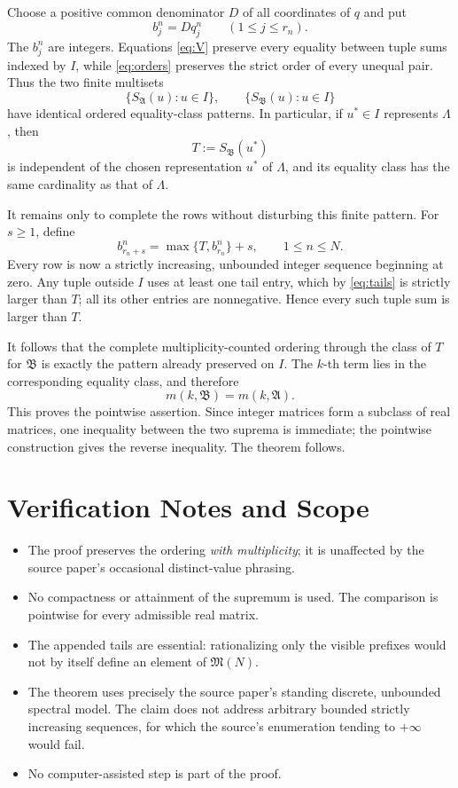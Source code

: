 \documentclass[11pt]{article}
\newcommand{\Acal}{\mathfrak A}
\newcommand{\Mcal}{\mathfrak M}
\begin{document}
Choose a positive common denominator $D$ of all coordinates of $q$ and put
\[
                           b_j^n=Dq_j^n
                           \qquad(1\leq j\leq r_n).
\]
The $b_j^n$ are integers.  Equations \eqref{eq:V} preserve every equality
between tuple sums indexed by $I$, while \eqref{eq:orders} preserves the
strict order of every unequal pair.  Thus the two finite multisets
\[
                  \{S_{\Acal}(u):u\in I\},
                  \qquad
                  \{S_{\mathfrak B}(u):u\in I\}
\]
have identical ordered equality-class patterns.  In particular, if
$u^*\in I$ represents $\Lambda$, then
\[
                  T:=S_{\mathfrak B}(u^*)
\]
is independent of the chosen representation $u^*$ of $\Lambda$, and its
equality class has the same cardinality as that of $\Lambda$.

It remains only to complete the rows without disturbing this finite pattern.
For $s\geq1$, define
\begin{equation}\label{eq:tails}
 b_{r_n+s}^n=\max\{T,b_{r_n}^n\}+s,
 \qquad 1\leq n\leq N.
\end{equation}
Every row is now a strictly increasing, unbounded integer sequence beginning
at zero.  Any tuple outside $I$ uses at least one tail entry, which by
\eqref{eq:tails} is strictly larger than $T$; all its other entries are
nonnegative.  Hence every such tuple sum is larger than $T$.

It follows that the complete multiplicity-counted ordering through the class
of $T$ for $\mathfrak B$ is exactly the pattern already preserved on $I$.
The $k$-th term lies in the corresponding equality class, and therefore
\[
                         m(k,\mathfrak B)=m(k,\Acal).
\]
This proves the pointwise assertion.  Since integer matrices form a subclass
of real matrices, one inequality between the two suprema is immediate; the
pointwise construction gives the reverse inequality.  The theorem follows.

\section*{Verification Notes and Scope}

\begin{itemize}
\item The proof preserves the ordering \emph{with multiplicity}; it is
unaffected by the source paper's occasional distinct-value phrasing.
\item No compactness or attainment of the supremum is used.  The comparison
is pointwise for every admissible real matrix.
\item The appended tails are essential: rationalizing only the visible
prefixes would not by itself define an element of $\Mcal(N)$.
\item The theorem uses precisely the source paper's standing discrete,
unbounded spectral model.  The claim does not address arbitrary bounded
strictly increasing sequences, for which the source's enumeration tending to
$+\infty$ would fail.
\item No computer-assisted step is part of the proof.
\end{itemize}
\end{document}
